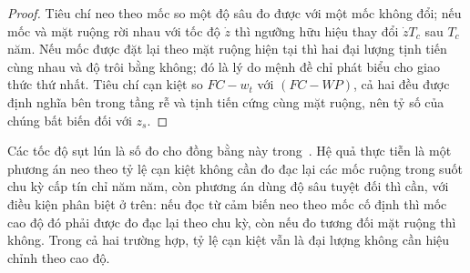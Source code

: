 \begin{proof}
Tiêu chí neo theo mốc so một độ sâu đo được với một mốc không đổi; nếu mốc và mặt
ruộng rời nhau với tốc độ $\dot z$ thì ngưỡng hữu hiệu thay đổi $\dot z T_c$ sau
$T_c$ năm. Nếu mốc được đặt lại theo mặt ruộng hiện tại thì hai đại lượng tịnh tiến
cùng nhau và độ trôi bằng không; đó là lý do mệnh đề chỉ phát biểu cho giao thức
thứ nhất.
Tiêu chí cạn kiệt so $FC-w_t$ với $(FC-WP)$, cả hai đều được định nghĩa bên trong tầng
rễ và tịnh tiến cứng cùng mặt ruộng, nên tỷ số của chúng bất biến đối với $z_s$.
\end{proof}

Các tốc độ sụt lún là số đo cho đồng bằng này trong~\cite{minderhoud2017}. Hệ quả thực
tiễn là một phương án neo theo tỷ lệ cạn kiệt không cần đo đạc lại các mốc ruộng trong
suốt chu kỳ cấp tín chỉ năm năm, còn phương án dùng độ sâu tuyệt đối thì cần, với điều kiện phân biệt ở trên:
nếu đọc từ cảm biến neo theo mốc cố định thì mốc cao độ đó phải được đo đạc lại
theo chu kỳ, còn nếu đo tương đối mặt ruộng thì không. Trong cả hai trường hợp,
tỷ lệ cạn kiệt vẫn là đại lượng không cần hiệu chỉnh theo cao độ.

